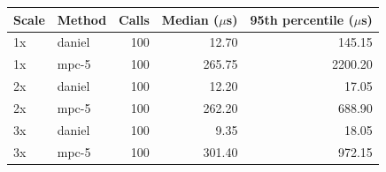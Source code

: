 \begin{tabular}{llrrr}
\toprule
Scale & Method & Calls & Median ($\mu$s) & 95th percentile ($\mu$s) \\ \midrule
1x & daniel & 100 & 12.70 & 145.15 \\ 
1x & mpc-5 & 100 & 265.75 & 2200.20 \\ 
2x & daniel & 100 & 12.20 & 17.05 \\ 
2x & mpc-5 & 100 & 262.20 & 688.90 \\ 
3x & daniel & 100 & 9.35 & 18.05 \\ 
3x & mpc-5 & 100 & 301.40 & 972.15 \\ 
\bottomrule
\end{tabular}
